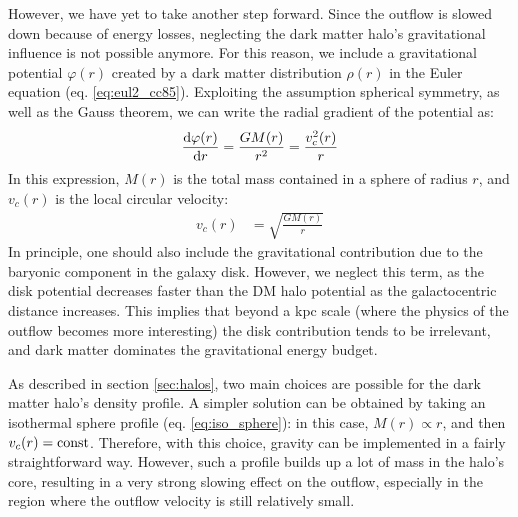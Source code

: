 However, we have yet to take another step forward. Since the outflow is slowed down because of energy losses, neglecting the dark matter halo's gravitational influence is not possible anymore. For this reason, we include a gravitational potential $\varphi(r)$ created by a dark matter distribution $\rho(r)$ in the Euler equation (eq. \ref{eq:eul2_cc85}). Exploiting the assumption spherical symmetry, as well as the Gauss theorem, we can write the radial gradient of the potential as:
\begin{align}
\frac{\mathrm{d} \varphi(r)}{\mathrm{d} r}=\frac{G M(r)}{r^2} = \frac{v_c^2(r)}{r}
\end{align}
In this expression, $M(r)$ is the total mass contained in a sphere of radius $r$, and $v_c(r)$ is the local circular velocity:
\begin{align}
v_{c}(r) &= \sqrt{\frac{GM(r)}{r}}
\label{eq:v_c_definition_model}
\end{align}
In principle, one should also include the gravitational contribution due to the baryonic component in the galaxy disk. However, we neglect this term, as the disk potential decreases faster than the DM halo potential as the galactocentric distance increases. This implies that beyond a kpc scale (where the physics of the outflow becomes more interesting) the disk contribution tends to be irrelevant, and dark matter dominates the gravitational energy budget.

As described in section \ref{sec:halos}, two main choices are possible for the dark matter halo's density profile. A simpler solution can be obtained by taking an isothermal sphere profile (eq. \ref{eq:iso_sphere}): in this case, $M(r)\propto r$, and then $v_c(r) = {\rm const}$. Therefore, with this choice, gravity can be implemented in a fairly straightforward way. However, such a profile builds up a lot of mass in the halo's core, resulting in a very strong slowing effect on the outflow, especially in the region where the outflow velocity is still relatively small. 

